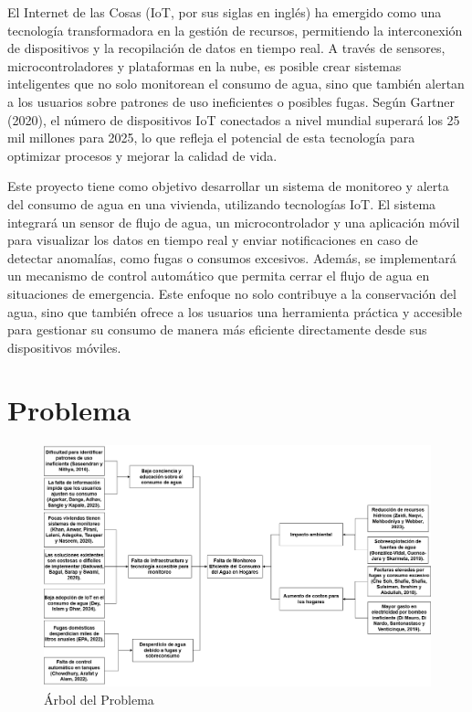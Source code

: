 \documentclass[conference]{IEEEtran}
\begin{document}
El Internet de las Cosas (IoT, por sus siglas en inglés) ha emergido como una
tecnología transformadora en la gestión de recursos, permitiendo la
interconexión de dispositivos y la recopilación de datos en tiempo real. A
través de sensores, microcontroladores y plataformas en la nube, es posible
crear sistemas inteligentes que no solo monitorean el consumo de agua, sino que
también alertan a los usuarios sobre patrones de uso ineficientes o posibles
fugas. Según Gartner (2020), el número de dispositivos IoT conectados a nivel
mundial superará los 25 mil millones para 2025, lo que refleja el potencial de
esta tecnología para optimizar procesos y mejorar la calidad de vida.

Este proyecto tiene como objetivo desarrollar un sistema de monitoreo y alerta
del consumo de agua en una vivienda, utilizando tecnologías IoT. El sistema
integrará un sensor de flujo de agua, un microcontrolador y una aplicación
móvil para visualizar los datos en tiempo real y enviar notificaciones en caso
de detectar anomalías, como fugas o consumos excesivos. Además, se implementará
un mecanismo de control automático que permita cerrar el flujo de agua en
situaciones de emergencia. Este enfoque no solo contribuye a la conservación
del agua, sino que también ofrece a los usuarios una herramienta práctica y
accesible para gestionar su consumo de manera más eficiente directamente desde
sus dispositivos móviles.

\section{Problema}

\begin{figure}[ht]
    \centering
    \includegraphics[width=\textwidth]{Arbol del problema.png}
    \caption{Árbol del Problema}
    \label{fig: Arbol del problema}
\end{figure}
\end{document}
